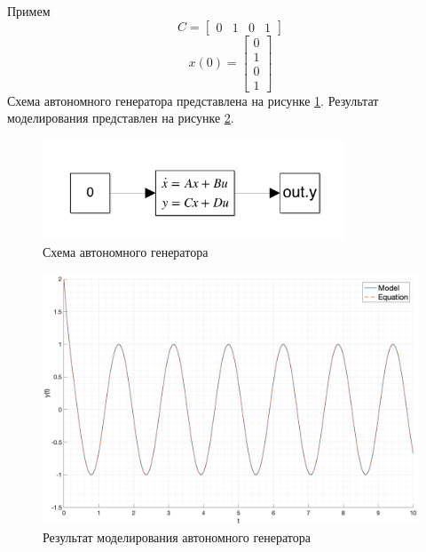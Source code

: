 Примем 
\begin{equation}
    C = \begin{bmatrix}
        0 & 1 & 0 & 1
    \end{bmatrix}
\end{equation}
\begin{equation}
    x(0) = \begin{bmatrix}
        0 \\
        1 \\
        0 \\
        1
    \end{bmatrix}
\end{equation}
Схема автономного генератора представлена на рисунке \ref{fig:autonomous_generator}.
Результат моделирования представлен на рисунке \ref{fig:autonomous_generator_simulation}.

\begin{figure}[ht!]
    \centering
    \includegraphics[width=0.8\textwidth]{media/scheme3.png}
    \caption{Схема автономного генератора}
    \label{fig:autonomous_generator}
\end{figure}

\begin{figure}[ht!]
    \centering
    \includegraphics[width=\textwidth]{media/generator.png}
    \caption{Результат моделирования автономного генератора}
    \label{fig:autonomous_generator_simulation}
\end{figure}

